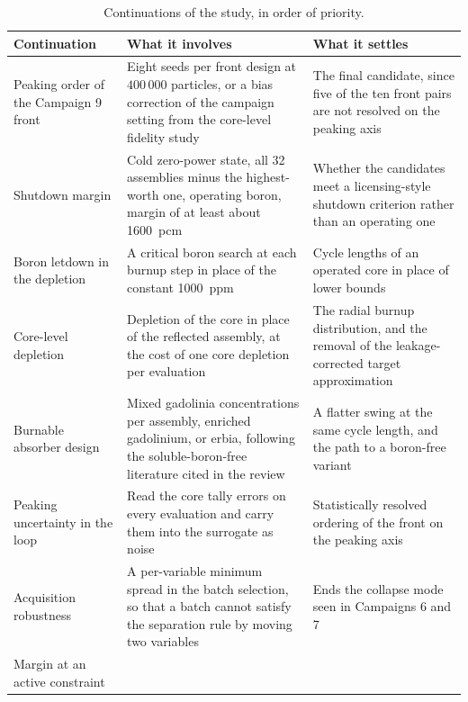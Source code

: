 \begin{table}[htbp]
  \centering
  \footnotesize
  \caption{Continuations of the study, in order of priority.}
  \label{tab:concl-future}
  \begin{tabularx}{\textwidth}{@{}>{\raggedright\arraybackslash}p{3.6cm}>{\raggedright\arraybackslash}X>{\raggedright\arraybackslash}p{4.0cm}@{}}
    \toprule
    Continuation & What it involves & What it settles \\
    \midrule
    Peaking order of the Campaign 9 front
      & Eight seeds per front design at $400\,000$ particles, or a bias correction of the campaign setting from the core-level fidelity study
      & The final candidate, since five of the ten front pairs are not resolved on the peaking axis \\
    \addlinespace
    Shutdown margin
      & Cold zero-power state, all 32 assemblies minus the highest-worth one, operating boron, margin of at least about \SI{1600}{pcm}
      & Whether the candidates meet a licensing-style shutdown criterion rather than an operating one \\
    \addlinespace
    Boron letdown in the depletion
      & A critical boron search at each burnup step in place of the constant \SI{1000}{ppm}
      & Cycle lengths of an operated core in place of lower bounds \\
    \addlinespace
    Core-level depletion
      & Depletion of the core in place of the reflected assembly, at the cost of one core depletion per evaluation
      & The radial burnup distribution, and the removal of the leakage-corrected target approximation \\
    \addlinespace
    Burnable absorber design
      & Mixed gadolinia concentrations per assembly, enriched gadolinium, or erbia, following the soluble-boron-free literature cited in the review
      & A flatter swing at the same cycle length, and the path to a boron-free variant \\
    \addlinespace
    Peaking uncertainty in the loop
      & Read the core tally errors on every evaluation and carry them into the surrogate as noise
      & Statistically resolved ordering of the front on the peaking axis \\
    \addlinespace
    Acquisition robustness
      & A per-variable minimum spread in the batch selection, so that a batch cannot satisfy the separation rule by moving two variables
      & Ends the collapse mode seen in Campaigns 6 and 7 \\
    \addlinespace
    Margin at an active constraint

\end{tabularx}
\end{table}
